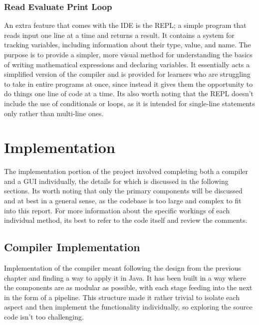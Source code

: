 \documentclass[
]{report}
\begin{document}
\subsection{Read Evaluate Print Loop}
An extra feature that comes with the IDE is the REPL; a simple program
that reads input one line at a time and returns a result. It contains a
system for tracking variables, including information about their type,
value, and name. The purpose is to provide a simpler, more visual method
for understanding the basics of writing mathematical expressions and
declaring variables. It essentially acts a simplified version of the
compiler and is provided for learners who are struggling to take in
entire programs at once, since instead it gives them the opportunity to
do things one line of code at a time. Its also worth noting that the
REPL doesn't include the use of conditionals or loops, as it is intended
for single-line statements only rather than multi-line ones.

\chapter{Implementation}
The implementation portion of the project involved completing both a
compiler and a GUI individually, the details for which is discussed in
the following sections. Its worth noting that only the primary
components will be discussed and at best in a general sense, as the
codebase is too large and complex to fit into this report. For more
information about the specific workings of each individual method, its
best to refer to the code itself and review the comments.

\section{Compiler Implementation}
Implementation of the compiler meant following the design from the
previous chapter and finding a way to apply it in Java. It has been
built in a way where the components are as modular as possible, with
each stage feeding into the next in the form of a pipeline. This
structure made it rather trivial to isolate each aspect and then
implement the functionality individually, so exploring the source code
isn't too challenging.
\end{document}
